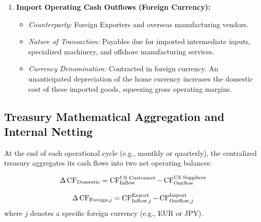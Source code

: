 \begin{enumerate}[leftmargin=1.8em, label=\textbf{\arabic*.}]
\begin{itemize}[noitemsep]
        \item \textit{Currency Denomination:} US Dollars (USD), representing non-exposed operational outflows.
    \end{itemize}
    \item \textbf{Import Operating Cash Outflows (Foreign Currency):}
    \begin{itemize}[noitemsep]
        \item \textit{Counterparty:} Foreign Exporters and overseas manufacturing vendors.
        \item \textit{Nature of Transaction:} Payables due for imported intermediate inputs, specialized machinery, and offshore manufacturing services.
        \item \textit{Currency Denomination:} Contracted in foreign currency. An unanticipated depreciation of the home currency increases the domestic cost of these imported goods, squeezing gross operating margins.
    \end{itemize}
\end{enumerate}

\vspace{0.3em}

\subsection{Treasury Mathematical Aggregation and Internal Netting}
At the end of each operational cycle (e.g., monthly or quarterly), the centralized treasury aggregates its cash flows into two net operating balances:

\begin{equation}
\Delta \operatorname{CF}_{\text{Domestic}} = \operatorname{CF}_{\text{Inflow}}^{\text{US Customers}} - \operatorname{CF}_{\text{Outflow}}^{\text{US Suppliers}}
\end{equation}

\begin{equation}
\Delta \operatorname{CF}_{\text{Foreign}, j} = \operatorname{CF}_{\text{Inflow}, j}^{\text{Export}} - \operatorname{CF}_{\text{Outflow}, j}^{\text{Import}}
\end{equation}
\noindent where $j$ denotes a specific foreign currency (e.g., EUR or JPY). 

